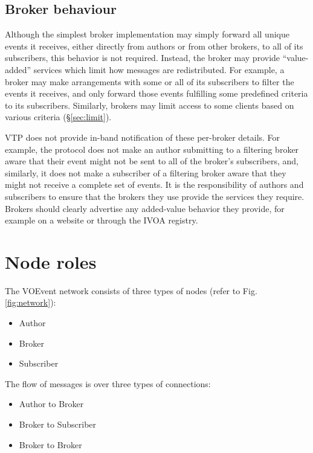 \documentclass[a4paper,11pt]{ivoa}
\begin{document}
\subsection{Broker behaviour}

Although the simplest broker implementation may simply forward all unique
events it receives, either directly from authors or from other brokers, to all
of its subscribers, this behavior is not required. Instead, the broker may
provide ``value-added'' services which limit how messages are redistributed.
For example, a broker may make arrangements with some or all of its
subscribers to filter the events it receives, and only forward those events
fulfilling some predefined criteria to its subscribers. Similarly, brokers may
limit access to some clients based on various criteria (\S\ref{sec:limit}).

VTP does not provide in-band notification of these per-broker details. For
example, the protocol does not make an author submitting to a filtering broker
aware that their event might not be sent to all of the broker's subscribers,
and, similarly, it does not make a subscriber of a filtering broker aware that
they might not receive a complete set of events. It is the responsibility of
authors and subscribers to ensure that the brokers they use provide the
services they require. Brokers should clearly advertise any added-value
behavior they provide, for example on a website or through the IVOA registry.

\section{Node roles}

The VOEvent network consists of three types of nodes (refer to Fig.
\ref{fig:network}):

\begin{itemize}
    \item{Author}
    \item{Broker}
    \item{Subscriber}
\end{itemize}

The flow of messages is over three types of connections:

\begin{itemize}
    \item{Author to Broker}
    \item{Broker to Subscriber}
    \item{Broker to Broker}
\end{itemize}
\end{document}
